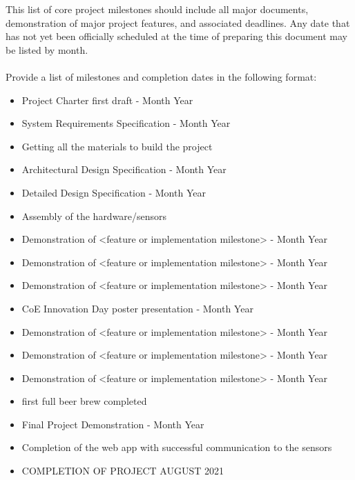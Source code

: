 This list of core project milestones should include all major documents, demonstration of major project features, and associated deadlines. Any date that has not yet been officially scheduled at the time of preparing this document may be listed by month.
\\
\\
Provide a list of milestones and completion dates in the following format:
\begin{itemize}
  \item Project Charter first draft - Month Year
  \item System Requirements Specification - Month Year
  \item Getting all the materials to build the project
  \item Architectural Design Specification - Month Year
  \item Detailed Design Specification - Month Year
  \item Assembly of the hardware/sensors
  \item Demonstration of <feature or implementation milestone> - Month Year
  \item Demonstration of <feature or implementation milestone> - Month Year
  \item Demonstration of <feature or implementation milestone> - Month Year
  \item CoE Innovation Day poster presentation - Month Year
  \item Demonstration of <feature or implementation milestone> - Month Year
  \item Demonstration of <feature or implementation milestone> - Month Year
  \item Demonstration of <feature or implementation milestone> - Month Year
  \item first full beer brew completed
  \item Final Project Demonstration - Month Year
    
  \item Completion of the web app with successful communication to the sensors
  \item COMPLETION OF PROJECT AUGUST 2021
\end{itemize}